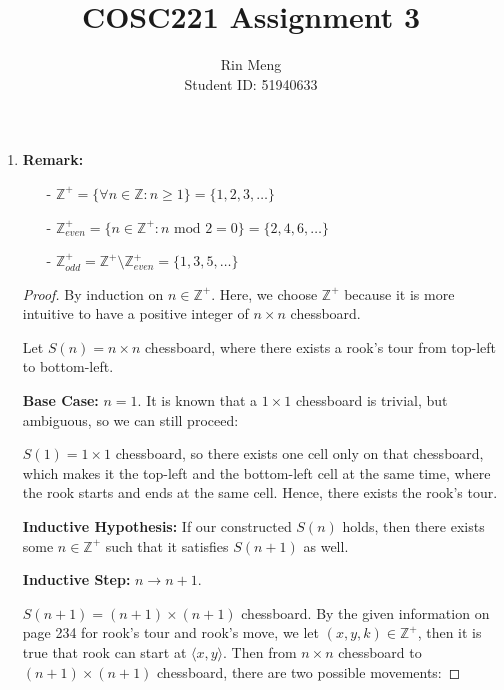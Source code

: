 \documentclass[12pt]{article}
\begin{document}
\title{COSC221 Assignment 3}
\author{Rin Meng \\ Student ID: 51940633}
\maketitle


\begin{enumerate}[label=Part \Alph*)]
    \item
    \textbf{Remark:} 
	\begin{itemize}
    \item[-]
        $\mathbb{Z}^{+} = \{\forall n \in \mathbb{Z} : n \geq 1\} = \{1, 2, 3, \ldots\}$
    	\item[-]$\mathbb{Z}_{even}^{+} = \{n \in \mathbb{Z}^{+} : n \text{ mod } 2 = 0\} = \{2, 4, 6, \ldots\}$
    	\item[-]$\mathbb{Z}_{odd}^{+} = \mathbb{Z}^{+} \setminus \mathbb{Z}_{even}^{+} = \{1, 3, 5, \ldots\}$
	\end{itemize}

    \begin{proof}[Proof]
        By induction on $n \in \mathbb{Z}^{+}$. Here, we choose $\mathbb{Z}^{+}$ because it is more intuitive to have a positive integer of $n \times n$ chessboard. 
        
        Let $S(n) = n \times n$ chessboard, where there exists a rook's tour from top-left to bottom-left.
        
        \textbf{Base Case:} $n = 1$. It is known that a $1 \times 1$ chessboard is trivial, but ambiguous, so we can still proceed:
        
        $S(1) = 1 \times 1$ chessboard, so there exists one cell only on that chessboard, which makes it the top-left and the bottom-left cell at the same time, where the rook starts and ends at the same cell. Hence, there exists the rook's tour.
        
        \textbf{Inductive Hypothesis:} If our constructed $S(n)$ holds, then there exists some $n \in \mathbb{Z}^{+}$ such that it satisfies $S(n + 1)$ as well.
        
        \textbf{Inductive Step:} $n \rightarrow n + 1$.
        
$S(n+1) = (n + 1) \times (n + 1)$ chessboard. By the given information on page 234 for rook's tour and rook's move, we let $(x, y, k) \in \mathbb{Z}^{+}$, then it is true that rook can start at $\langle x, y \rangle$. Then from $n \times n$ chessboard to $(n + 1) \times (n + 1)$ chessboard, there are two possible movements:


\end{proof}
\end{enumerate}
\end{document}
